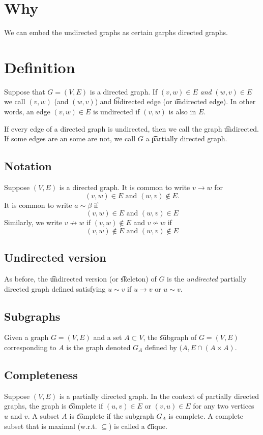 
\section*{Why}

We can embed the undirected graphs as certain garphs directed graphs.

\section*{Definition}

Suppose that $G = (V, E)$ is a directed graph.
If $(v, w) \in E$ \textit{and} $(w, v) \in E$ we call $(v, w)$ (and $(w, v)$) and \t{bidirected edge} (or \t{undirected edge}).
In other words, an edge $(v, w) \in E$ is undirected if $(v, w)$ is also in $E$.

If every edge of a directed graph is undirected, then we call the graph \t{undirected}.
If some edges are an some are not, we call $G$ a \t{partially directed graph}.

\subsection*{Notation}

Suppose $(V, E)$ is a directed graph.
It is common to write $v \to w$ for
\[
(v, w) \in E \text{ and } (w, v) \not\in E.
\]
It is common to write $a \sim \beta $ if
\[
(v, w) \in E \text{ and } (w, v) \in E
\]
Similarly, we write $v \not\to w$ if $(v, w) \not\in E$ and $v \not\sim w$ if
\[
(v, w) \not\in E \text{ and } (w, v) \not\in E
\]

\subsection*{Undirected version}

As before, the \t{undirected version} (or \t{skeleton}) of $G$ is the \textit{undirected} partially directed graph defined satisfying $u \sim v$ if $u \to v$ or $u \sim v$.

\subsection*{Subgraphs}

Given a graph $G = (V, E)$ and a set $A \subset V$, the \t{subgraph} of $G = (V, E)$ corresponding to $A$ is the graph denoted $G_{A}$ defined by $(A, E \cap  (A \times  A)$.

\subsection*{Completeness}

Suppose $(V, E)$ is a partially directed graph.
In the context of partially directed graphs, the graph is \t{complete} if $(u,v) \in E$ or $(v, u) \in E$ for any two vertices $u$ and $v$.
A subset $A$ is \t{complete} if the subgraph $G_A$ is complete.
A complete subset that is maximal (w.r.t. $\subseteq$) is called a \t{clique}.

\blankpage